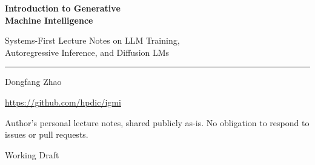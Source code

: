 \documentclass[11pt, oneside]{book}
\begin{document}
\frontmatter
\hypersetup{pageanchor=false}
\begin{titlepage}
    \vspace*{2.2cm}
    {\sffamily\Huge\bfseries\color{igmi-accent} Introduction to Generative\\Machine Intelligence\par}
    \vspace{0.8cm}
    {\sffamily\Large\color{igmi-muted} Systems-First Lecture Notes on LLM Training,\\Autoregressive Inference, and Diffusion LMs\par}
    \vspace{1.2cm}
    {\color{igmi-rule}\rule{\linewidth}{0.8pt}}
    \vspace{1.2cm}
    {\sffamily\large Dongfang Zhao\par}
    \vspace{0.2cm}
    {\sffamily\normalsize\color{igmi-muted} \par}
    \vspace{0.15cm}
    {\sffamily\normalsize\color{igmi-muted} \url{https://github.com/hpdic/igmi}\par}
    \vfill
    {\sffamily\footnotesize\color{igmi-muted} Author's personal lecture notes, shared publicly as-is. No obligation to respond to issues or pull requests.\par}
    \vspace{0.25cm}
    {\sffamily\small\color{igmi-muted} Working Draft\par}
\end{titlepage}
\hypersetup{pageanchor=true}

\tableofcontents

\mainmatter


% 
% 
\end{document}
